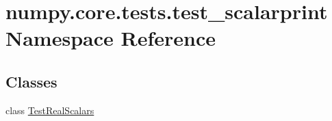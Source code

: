 \hypertarget{namespacenumpy_1_1core_1_1tests_1_1test__scalarprint}{}\section{numpy.\+core.\+tests.\+test\+\_\+scalarprint Namespace Reference}
\label{namespacenumpy_1_1core_1_1tests_1_1test__scalarprint}
\subsection*{Classes}
\begin{DoxyCompactItemize}
\item 
class \hyperlink{classnumpy_1_1core_1_1tests_1_1test__scalarprint_1_1TestRealScalars}{Test\+Real\+Scalars}
\end{DoxyCompactItemize}
